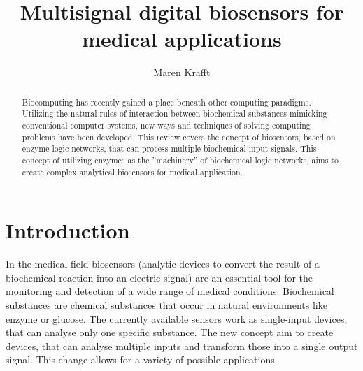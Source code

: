 \documentclass[runningheads]{llncs}
\begin{document}
\title{Multisignal digital biosensors for medical applications}
\author{Maren Krafft}
\maketitle        

      
\begin{abstract}
Biocomputing has recently gained a place beneath other computing paradigms. Utilizing the natural rules of interaction between biochemical substances mimicking conventional computer systems, new ways and techniques of solving computing problems have been developed. This review covers the concept of biosensors, based on enzyme logic networks, that can process multiple biochemical input signals. This concept of utilizing enzymes as the ''machinery'' of biochemical logic networks, aims to create complex analytical biosensors for medical application.


\end{abstract}


\section{Introduction}

	In the medical field biosensors (analytic devices to convert the result of a biochemical reaction into an electric signal) are an essential tool for the monitoring and detection of a wide range of medical conditions. Biochemical substances are chemical substances that occur in natural environments like enzyme or glucose. The currently available sensors work as single-input devices, that can analyse only one specific substance. The new concept aim to create devices, that can analyse multiple inputs and transform those into a single output signal. This change allows for a variety of possible applications.\\
	
\end{document}
